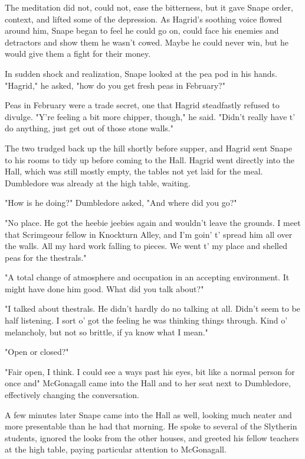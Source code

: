 The meditation did not, could not, ease the bitterness, but it gave Snape order, context, and lifted some of the depression. As Hagrid's soothing voice flowed around him, Snape began to feel he could go on, could face his enemies and detractors and show them he wasn't cowed. Maybe he could never win, but he would give them a fight for their money.

In sudden shock and realization, Snape looked at the pea pod in his hands. "Hagrid," he asked, "how do you get fresh peas in February?"

Peas in February were a trade secret, one that Hagrid steadfastly refused to divulge. "Y're feeling a bit more chipper, though," he said. "Didn't really have t' do anything, just get out of those stone walls."

The two trudged back up the hill shortly before supper, and Hagrid sent Snape to his rooms to tidy up before coming to the Hall. Hagrid went directly into the Hall, which was still mostly empty, the tables not yet laid for the meal. Dumbledore was already at the high table, waiting.

"How is he doing?" Dumbledore asked, "And where did you go?"

"No place. He got the heebie jeebies again and wouldn't leave the grounds. I meet that Scrimgeour fellow in Knockturn Alley, and I'm goin' t' spread him all over the walls. All my hard work falling to pieces. We went t' my place and shelled peas for the thestrals."

"A total change of atmosphere and occupation in an accepting environment. It might have done him good. What did you talk about?"

"I talked about thestrals. He didn't hardly do no talking at all. Didn't seem to be half listening. I sort o' got the feeling he was thinking things through. Kind o' melancholy, but not so brittle, if ya know what I mean."

"Open or closed?"

"Fair open, I think. I could see a ways past his eyes, bit like a normal person for once and{\el}" McGonagall came into the Hall and to her seat next to Dumbledore, effectively changing the conversation.

A few minutes later Snape came into the Hall as well, looking much neater and more presentable than he had that morning. He spoke to several of the Slytherin students, ignored the looks from the other houses, and greeted his fellow teachers at the high table, paying particular attention to McGonagall.

